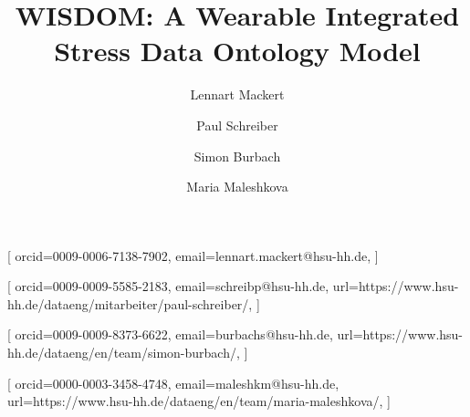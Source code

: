 \documentclass[
]{ceurart}
\begin{document}


\title{WISDOM: A Wearable Integrated Stress Data Ontology Model}


\author{Lennart Mackert}[%
orcid=0009-0006-7138-7902, 
email=lennart.mackert@hsu-hh.de,
]

\address{Professorship of Data Engineering, Helmut Schmidt University, Holstenhofweg 85, 22043 Hamburg, Germany}

\author{Paul Schreiber}[
orcid=0009-0009-5585-2183,
email=schreibp@hsu-hh.de,
url=https://www.hsu-hh.de/dataeng/mitarbeiter/paul-schreiber/,
]

\author{Simon Burbach}[%
orcid=0009-0009-8373-6622,
email=burbachs@hsu-hh.de,
url=https://www.hsu-hh.de/dataeng/en/team/simon-burbach/,
]

\author{Maria Maleshkova}[%
orcid=0000-0003-3458-4748,
email=maleshkm@hsu-hh.de,
url=https://www.hsu-hh.de/dataeng/en/team/maria-maleshkova/,
]



\end{document}
